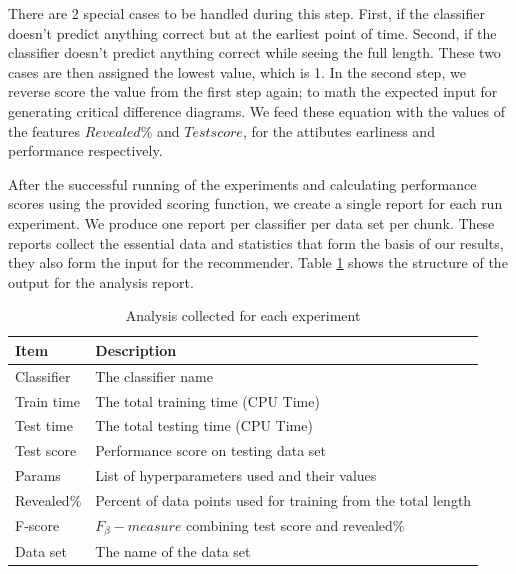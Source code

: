 There are 2 special cases to be handled during this step.
First, if the classifier doesn't predict anything correct but at the earliest point of time.
Second, if the classifier doesn't predict anything correct while seeing the full length.
These two cases are then assigned the lowest value, which is 1.
In the second step, we reverse score the value from the first step again; to math the expected input for generating critical difference diagrams.
We feed these equation with the values of the features $Revealed \%$ and $Test score$, for the attibutes earliness and performance respectively.

After the successful running of the experiments and calculating performance scores using the provided scoring function, we create a single report for each run experiment.
We produce one report per classifier per data set per chunk.
These reports collect the essential data and statistics that form the basis of our results, they also form the input for the recommender.
Table \ref{TableAnalysisReport} shows the structure of the output for the analysis report.

\begin{table}
  \setlength\extrarowheight{2pt} %
  \begin{tabularx}{\textwidth}{|X|X|}
  \hline
  \textbf{Item} & \textbf{Description} \\ \hline
    Classifier                 & The classifier name                                             \\ \hline
    Train time                 & The total training time (CPU Time)                              \\ \hline
    Test time                  & The total testing time (CPU Time)                               \\ \hline
    Test score                 & Performance score on testing data set                           \\ \hline
    Params                     & List of hyperparameters used and their values                   \\ \hline
    Revealed\%                 & Percent of data points used for training from the total length  \\ \hline
    F-score                    & $F_{\beta}-measure$ combining test score and revealed\%         \\ \hline
    Data set                   & The name of the data set                                        \\ \hline
  \end{tabularx}
  \caption{Analysis collected for each experiment}
  \label{TableAnalysisReport}
\end{table}

